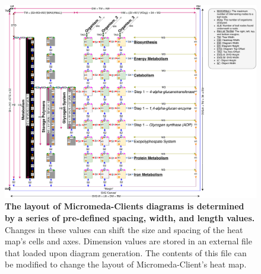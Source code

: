 \begin{figure}[!ht]
  \centering
	\includegraphics[width=\textwidth]{media/diagram_measurements.pdf}
	 \caption[The layout of Micromeda-Clients diagrams is determined by a series of pre-defined spacing, width, and length values.]{\textbf{The layout of Micromeda-Clients diagrams is determined by a series of pre-defined spacing, width, and length values.} Changes in these values can shift the size and spacing of the heat map's cells and axes. Dimension values are stored in an external file that loaded upon diagram generation. The contents of this file can be modified to change the layout of Micromeda-Client's heat map.}
	 \label{fig:diagram-measurements}
\end{figure}

